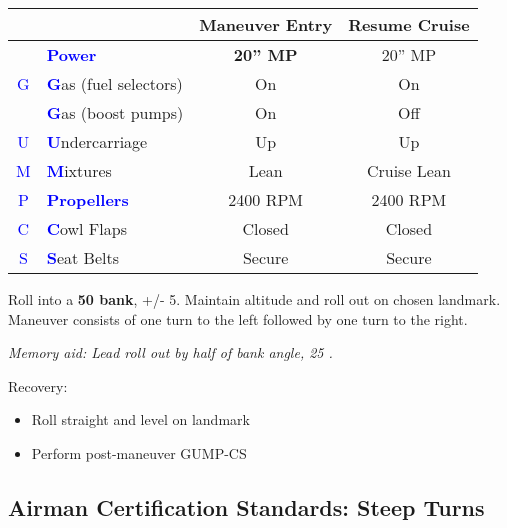 {\begin{table}[H]
\centering
\begin{tabular}{|c|l|c|c|}
\hline
                    &                                                 & \textbf{Maneuver Entry} & \textbf{Resume Cruise} \\ \hline
                    & \textcolor{blue}{\textbf{Power}}                & \textbf{20'' MP}        & 20'' MP                \\ \hline
\textcolor{blue}{G} & \textcolor{blue}{\textbf{G}}as (fuel selectors) & On                      & On                     \\
                    & \textcolor{blue}{\textbf{G}}as (boost pumps)    & On                      & Off                    \\ \hline
\textcolor{blue}{U} & \textcolor{blue}{\textbf{U}}ndercarriage        & Up                      & Up                     \\ \hline
\textcolor{blue}{M} & \textcolor{blue}{\textbf{M}}ixtures             & Lean                    & Cruise Lean            \\ \hline
\textcolor{blue}{P} & \textcolor{blue}{\textbf{Propellers}}           & 2400 RPM                & 2400 RPM               \\ \hline
\textcolor{blue}{C} & \textcolor{blue}{\textbf{C}}owl Flaps           & Closed                  & Closed                 \\ \hline
\textcolor{blue}{S} & \textcolor{blue}{\textbf{S}}eat Belts           & Secure                  & Secure                 \\ \hline
\end{tabular}
\end{table}

Roll into a \textbf{50\degree{} bank}, +/- 5\degree{}. Maintain altitude and roll out on chosen landmark.
Maneuver consists of one turn to the left followed by one turn to the right.

\emph{Memory aid: Lead roll out by half of bank angle, 25 \degree{}.}

Recovery:
\begin{itemize}[label={}]
\item Roll straight and level on landmark
\item Perform post-maneuver GUMP-CS
\end{itemize}

\newpage 

\subsection{Airman Certification Standards: Steep Turns}

}
